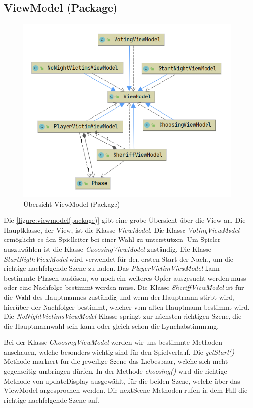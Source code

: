 \subsection{ViewModel (Package)}

\begin{figure}[H]
	\centering
	\includegraphics[width=\textwidth]{architektur/View_Uebersicht.png}
	\caption{Übersicht ViewModel (Package)}
	\label{figure:viewmodel(package)}
\end{figure}

Die \autoref{figure:viewmodel(package)} gibt eine grobe Übersicht über die View an. Die Hauptklasse, der View, ist die Klasse \textit{ViewModel}. Die Klasse \textit{VotingViewModel} ermöglicht es den Spielleiter bei einer Wahl zu unterstützen. Um Spieler auszuwählen ist die Klasse \textit{ChoosingViewModel} zuständig. Die Klasse \textit{StartNigthViewModel} wird verwendet für den ersten Start der Nacht, um die richtige nachfolgende Szene zu laden. Das \textit{PlayerVictimViewModel} kann bestimmte Phasen auslösen, wo noch ein weiteres Opfer ausgesucht werden muss oder eine Nachfolge bestimmt werden muss. 
Die Klasse \textit{SheriffViewModel} ist für die Wahl des Hauptmannes zuständig und wenn der Hauptmann stirbt wird, hierüber der Nachfolger bestimmt, welcher vom alten Hauptmann bestimmt wird. Die \textit{NoNightVictimsViewModel} Klasse springt zur nächsten richtigen Szene, die die Hauptmannwahl sein kann oder gleich schon die Lynchabstimmung.

\medskip
Bei der Klasse \textit{ChoosingViewModel} werden wir uns bestimmte Methoden anschauen, welche besonders wichtig sind für den Spielverlauf.
Die \textit{getStart()} Methode markiert für die jeweilige Szene das Liebespaar, welche sich nicht gegenseitig umbringen dürfen.
In der Methode \textit{choosing()} wird die richtige Methode von updateDisplay ausgewählt, für die beiden Szene, welche über das ViewModel angesprochen werden.
Die nextScene Methoden rufen in dem Fall die richtige nachfolgende Szene auf.

